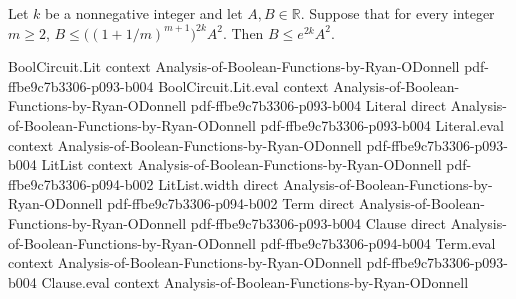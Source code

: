 \begin{theorem}
\leanok
{}
Let $k$ be a nonnegative integer and let $A,B\in\mathbb R$. Suppose that for every
integer $m\ge2$, $B\le\bigl((1+1/m)^{m+1}\bigr)^{2k}A^2$. Then $B\le e^{2k}A^2$.
\end{theorem}

\begin{theorem}
\leanok
{}
\proofstep
  {BoolCircuit.Lit}
  {context}
  {Analysis-of-Boolean-Functions-by-Ryan-ODonnell}
  {pdf-ffbe9c7b3306-p093-b004}
\proofstep
  {BoolCircuit.Lit.eval}
  {context}
  {Analysis-of-Boolean-Functions-by-Ryan-ODonnell}
  {pdf-ffbe9c7b3306-p093-b004}
\proofstep
  {Literal}
  {direct}
  {Analysis-of-Boolean-Functions-by-Ryan-ODonnell}
  {pdf-ffbe9c7b3306-p093-b004}
\proofstep
  {Literal.eval}
  {context}
  {Analysis-of-Boolean-Functions-by-Ryan-ODonnell}
  {pdf-ffbe9c7b3306-p093-b004}
\proofstep
  {LitList}
  {context}
  {Analysis-of-Boolean-Functions-by-Ryan-ODonnell}
  {pdf-ffbe9c7b3306-p094-b002}
\proofstep
  {LitList.width}
  {direct}
  {Analysis-of-Boolean-Functions-by-Ryan-ODonnell}
  {pdf-ffbe9c7b3306-p094-b002}
\proofstep
  {Term}
  {direct}
  {Analysis-of-Boolean-Functions-by-Ryan-ODonnell}
  {pdf-ffbe9c7b3306-p093-b004}
\proofstep
  {Clause}
  {direct}
  {Analysis-of-Boolean-Functions-by-Ryan-ODonnell}
  {pdf-ffbe9c7b3306-p094-b004}
\proofstep
  {Term.eval}
  {context}
  {Analysis-of-Boolean-Functions-by-Ryan-ODonnell}
  {pdf-ffbe9c7b3306-p093-b004}
\proofstep
  {Clause.eval}
  {context}
  {Analysis-of-Boolean-Functions-by-Ryan-ODonnell}

\end{theorem}
